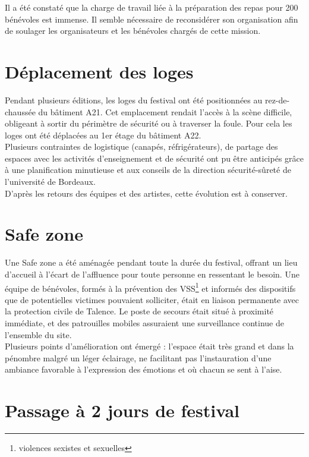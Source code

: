 \documentclass[12pt,a4paper]{report}
\begin{document}
Il a été constaté que la charge de travail liée à la préparation des repas pour 200 bénévoles est immense. Il semble nécessaire de reconsidérer son organisation afin de soulager les organisateurs et les bénévoles chargés de cette mission. 

\section{Déplacement des loges}
Pendant plusieurs éditions, les loges du festival ont été positionnées au rez-de-chaussée du bâtiment A21. Cet emplacement rendait l'accès à la scène difficile, obligeant à sortir du périmètre de sécurité ou à traverser la foule. Pour cela les loges ont été déplacées au 1er étage du bâtiment A22.\\

Plusieurs contraintes de logistique (canapés, réfrigérateurs), de partage des espaces avec les activités d'enseignement et de sécurité ont pu être anticipés grâce à une planification minutieuse et aux conseils de la direction sécurité-sûreté de l'université de Bordeaux.\\

D’après les retours des équipes et des artistes, cette évolution est à conserver.

\section{Safe zone}
Une \og Safe zone \fg{} a été aménagée pendant toute la durée du festival, offrant un lieu d'accueil à l'écart de l'affluence pour toute personne en ressentant le besoin. Une équipe de bénévoles, formés à la prévention des VSS\footnote{violences sexistes et sexuelles} et informés des dispositifs que de potentielles victimes pouvaient solliciter, était en liaison permanente avec la protection civile de Talence. Le poste de secours était situé à proximité immédiate, et des patrouilles mobiles assuraient une surveillance continue de l'ensemble du site.\\

Plusieurs points d’amélioration ont émergé : l’espace était très grand et dans la pénombre malgré un léger éclairage, ne facilitant pas l’instauration d’une ambiance favorable à l’expression des émotions et où chacun se sent à l’aise.

\section{Passage à 2 jours de festival}
\end{document}
